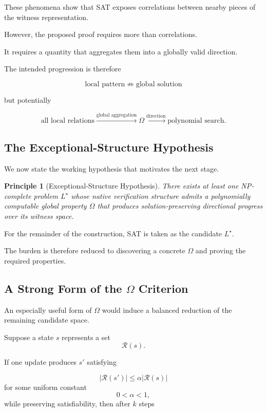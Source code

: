\documentclass[11pt]{article}
\theoremstyle{plain}
\newtheorem{principle}[theorem]{Principle}
\theoremstyle{definition}
\begin{document}
These phenomena show that SAT exposes correlations between nearby pieces of
the witness representation.

However, the proposed proof requires more than correlations.

It requires a quantity that aggregates them into a globally valid direction.

The intended progression is therefore

\[
    \boxed{
    \text{local pattern}
    \;\not\Rightarrow\;
    \text{global solution}
    }
\]

but potentially

\[
    \boxed{
    \text{all local relations}
    \xrightarrow{\text{global aggregation}}
    \Omega
    \xrightarrow{\text{direction}}
    \text{polynomial search}.
    }
\]

\subsection{The Exceptional-Structure Hypothesis}

We now state the working hypothesis that motivates the next stage.

\begin{principle}[Exceptional-Structure Hypothesis]
\label{principle:exceptional-structure}
There exists at least one NP-complete problem \(L^\star\) whose native
verification structure admits a polynomially computable global property
\(\Omega\) that produces solution-preserving directional progress over its
witness space.
\end{principle}

For the remainder of the construction, SAT is taken as the candidate
\(L^\star\).

The burden is therefore reduced to discovering a concrete \(\Omega\) and
proving the required properties.

\subsection{A Strong Form of the \(\Omega\) Criterion}

An especially useful form of \(\Omega\) would induce a balanced reduction of
the remaining candidate space.

Suppose a state \(s\) represents a set
\[
    \mathcal{R}(s).
\]

If one update produces \(s'\) satisfying

\[
    |\mathcal{R}(s')|
    \leq
    \alpha |\mathcal{R}(s)|
\]
for some uniform constant
\[
    0<\alpha<1,
\]
while preserving satisfiability, then after \(k\) steps
\end{document}
